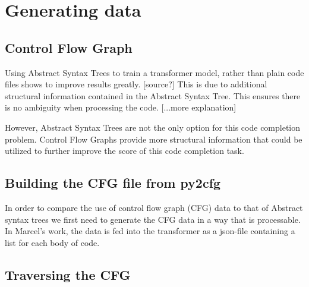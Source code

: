 \chapter{Generating data}
\section{Control Flow Graph}
Using Abstract Syntax Trees to train a transformer model, rather than plain code files shows to improve results greatly. [source?] This is due to additional structural information contained in the Abstract Syntax Tree. This ensures there is no ambiguity when processing the code. [...more explanation]

However, Abstract Syntax Trees are not the only option for this code completion problem. Control Flow Graphs provide more structural information that could be utilized to further improve the score of this code completion task.




\section{Building the CFG file from py2cfg}
In order to compare the use of control flow graph (CFG) data to that of Abstract syntax trees we first need to generate the CFG data in a way that is processable. In Marcel's work, the data is fed into the transformer as a json-file containing a list for each body of code.

\section{Traversing the CFG}
